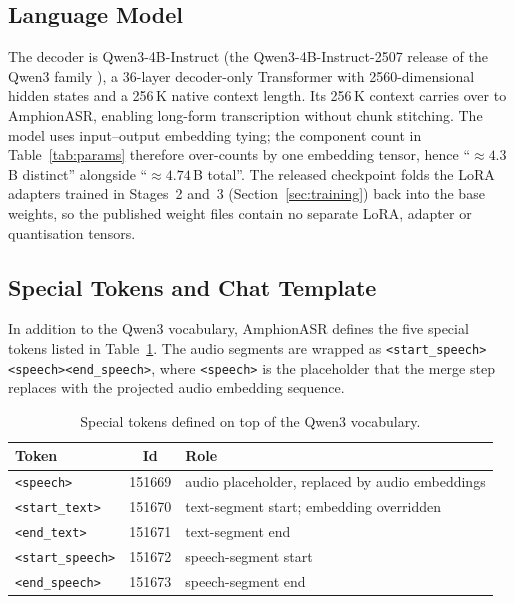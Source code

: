 \subsection{Language Model}
\label{subsec:llm}

The decoder is Qwen3-4B-Instruct (the Qwen3-4B-Instruct-2507 release
of the Qwen3 family \cite{qwen2025qwen3}), a 36-layer decoder-only
Transformer with 2560-dimensional hidden states and a 256\,K native
context length. Its 256\,K context carries over to AmphionASR, enabling
long-form transcription without chunk stitching. The model uses
input--output embedding tying; the component count in
Table~\ref{tab:params} therefore over-counts by one embedding tensor,
hence ``$\approx\!4.3$\,B distinct'' alongside
``$\approx\!4.74$\,B total''. The released checkpoint folds the LoRA
adapters trained in Stages~2 and~3 (Section~\ref{sec:training}) back
into the base weights, so the published weight files contain no
separate LoRA, adapter or quantisation tensors.

\subsection{Special Tokens and Chat Template}
\label{subsec:tokens}

In addition to the Qwen3 vocabulary, AmphionASR defines the five
special tokens listed in Table~\ref{tab:tokens}. The audio segments
are wrapped as \verb|<start_speech><speech><end_speech>|, where
\verb|<speech>| is the placeholder that the merge step replaces
with the projected audio embedding sequence.

\begin{table}[t]
  \caption{Special tokens defined on top of the Qwen3 vocabulary.}
  \label{tab:tokens}
  \centering
  \small
  \begin{tabular}{lcl}
    \toprule
    Token            & Id      & Role \\
    \midrule
    \texttt{<speech>}        & 151669 & audio placeholder, replaced by audio embeddings \\
    \texttt{<start\_text>}    & 151670 & text-segment start; embedding overridden \\
    \texttt{<end\_text>}      & 151671 & text-segment end \\
    \texttt{<start\_speech>}  & 151672 & speech-segment start \\
    \texttt{<end\_speech>}    & 151673 & speech-segment end \\
    \bottomrule
  \end{tabular}
\end{table}


